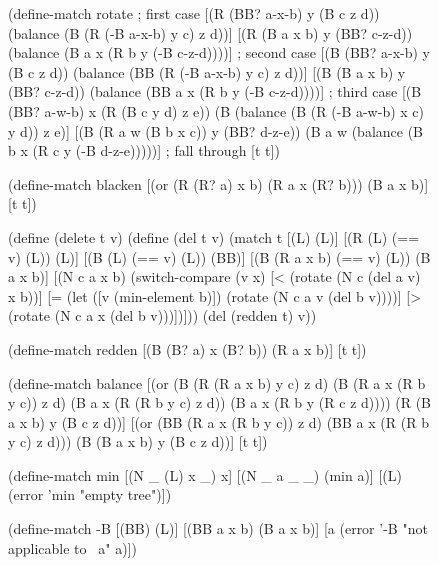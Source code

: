 \documentclass[preprint]{sigplanconf}
\begin{document}
\begin{figure*}
\centering
\begin{subfigure}[t]{0.33\textwidth}
\begin{schemedisplay}
(define-match rotate
  ; first case
  [(R (BB? a-x-b) y (B c z d))
   (balance (B (R (-B a-x-b) y c) z d))]
  [(R (B a x b) y (BB? c-z-d))
   (balance (B a x (R b y (-B c-z-d))))]
  ; second case
  [(B (BB? a-x-b) y (B c z d))
   (balance (BB (R (-B a-x-b) y c) z d))]
  [(B (B a x b) y (BB? c-z-d))
   (balance (BB a x (R b y (-B c-z-d))))]
  ; third case
  [(B (BB? a-w-b) x (R (B c y d) z e))
   (B (balance (B (R (-B a-w-b) x c) y d)) z e)]
  [(B (R a w (B b x c)) y (BB? d-z-e))
   (B a w (balance (B b x (R c y (-B d-z-e)))))]
  ; fall through
  [t t])

(define-match blacken
  [(or (R (R? a) x b)
       (R a x (R? b)))
   (B a x b)]
  [t t])
\end{schemedisplay}
\end{subfigure}%
\begin{subfigure}[t]{0.33\textwidth}
\begin{schemedisplay}
(define (delete t v)
  (define (del t v)
    (match t
      [(L) (L)]
      [(R (L) (== v) (L))
       (L)]
      [(B (L) (== v) (L))
       (BB)]
      [(B (R a x b) (== v) (L))
       (B a x b)]
      [(N c a x b)
       (switch-compare
        (v x)
        [< (rotate (N c (del a v) x b))]
        [= (let ([v (min-element b)])
             (rotate (N c a v (del b v))))]
        [> (rotate (N c a x (del b v)))])]))
  (del (redden t) v))

(define-match redden
  [(B (B? a) x (B? b))
   (R a x b)]
  [t t])
\end{schemedisplay}
\end{subfigure}%
\begin{subfigure}[t]{0.33\textwidth}
\begin{schemedisplay}
(define-match balance
  [(or (B (R (R a x b) y c) z d)
       (B (R a x (R b y c)) z d)
       (B a x (R (R b y c) z d))
       (B a x (R b y (R c z d))))
   (R (B a x b) y (B c z d))]
  [(or (BB (R a x (R b y c)) z d)
       (BB a x (R (R b y c) z d)))
   (B (B a x b) y (B c z d))]
  [t t])

(define-match min
  [(N _ (L) x _) x]
  [(N _ a _ _) (min a)]
  [(L) (error 'min "empty tree")])

(define-match -B
  [(BB) (L)]
  [(BB a x b) (B a x b)]
  [a (error '-B "not applicable to ~a" a)])
\end{schemedisplay}
\end{subfigure}
\caption{The essence of the \emph{delete} implementation}
\label{fig:implementation}
\end{figure*}
\end{document}
